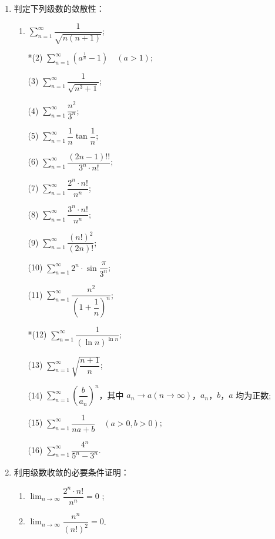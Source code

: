 \begin{enumerate}
    \item 判定下列级数的敛散性：
    \begin{enumerate}[(1)]\setlength{\itemsep}{10pt}\setlength{\topsep}{15pt}
        \item $\displaystyle\sum_{n=1}^{\infty}\dfrac{1}{\sqrt{n(n+1)}}$;
        \item[*(2)] $\displaystyle \sum_{n=1}^{\infty}(a^{\frac{1}{n}}-1)\quad(a>1)$;
        \item[(3)] $\displaystyle \sum_{n=1}^{\infty}\dfrac{1}{\sqrt{n^3+1}}$;
        \item[(4)] $\displaystyle \sum_{n=1}^{\infty}\dfrac{n^2}{3^n}$;
        \item[(5)] $\displaystyle \sum_{n=1}^{\infty}\dfrac{1}{n}\tan\dfrac{1}{n}$;
        \item[(6)] $\displaystyle \sum_{n=1}^{\infty}\dfrac{(2n-1)!!}{3^n\cdot n!}$;
        \item[(7)] $\displaystyle \sum_{n=1}^{\infty}\dfrac{2^n\cdot n!}{n^n}$;
        \item[(8)] $\displaystyle \sum_{n=1}^{\infty}\dfrac{3^n\cdot n!}{n^n}$;
        \item[(9)] $\displaystyle \sum_{n=1}^{\infty}\dfrac{(n!)^2}{(2n)!}$;
        \item[(10)] $\displaystyle\sum_{n=1}^{\infty}2^n\cdot\sin\dfrac{\pi}{3^n}$;
        \item[(11)] $\displaystyle\sum_{n=1}^{\infty}\dfrac{n^2}{\left(1+\dfrac{1}{n}\right)^n}$;
        \item[*(12)] $\displaystyle\sum_{n=1}^{\infty}\dfrac{1}{(\ln n)^{\ln n}}$;
        \item[(13)] $\displaystyle\sum_{n=1}^{\infty}\sqrt{\dfrac{n+1}{n}}$;
        \item[(14)] $\displaystyle\sum_{n=1}^{\infty}\left(\dfrac{b}{a_n}\right)^n$，其中 $a_n\to a(n\to\infty)$，$a_n$，$b$，$a$ 均为正数;
        \item[(15)] $\displaystyle\sum_{n=1}^{\infty}\dfrac{1}{na+b}\quad(a>0,b>0)$;
        \item[(16)] $\displaystyle\sum_{n=1}^{\infty}\dfrac{4^n}{5^n-3^n}$.        
    \end{enumerate}

    \item 利用级数收敛的必要条件证明：
    \begin{enumerate}[(1)]\setlength{\itemsep}{10pt}\setlength{\topsep}{15pt}
        \item $\displaystyle\lim_{n\to\infty}\dfrac{2^n\cdot n!}{n^n}=0$ ;
        \item $\displaystyle\lim_{n\to\infty}\dfrac{n^n}{(n!)^2}=0$.
    \end{enumerate}


\end{enumerate}
